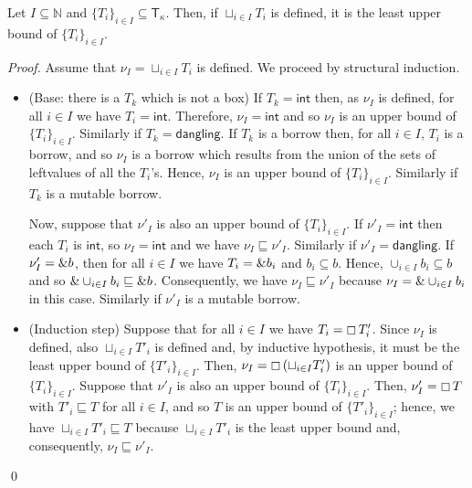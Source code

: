 \begin{lemma}\label{lemma:lub-type}
  Let $I\subseteq\mathbb{N}$ and $\{T_i\}_{i\in I}\subseteq\mathsf{T}_\kappa$.
  Then, if $\sqcup_{i\in I}T_i$ is defined, it is the least upper bound of
  $\{T_i\}_{i\in I}$.
\end{lemma}
\begin{proof}
  Assume that $\nu_I = \sqcup_{i\in I}T_i$ is defined.
  We proceed by structural induction.
  \begin{itemize}
    \item (Base: there is a $T_k$ which is not a box)
    If $T_k=\mathsf{int}$ then, as $\nu_I$ is defined, for all $i\in I$
    we have $T_i=\mathsf{int}$. Therefore, $\nu_I=\mathsf{int}$
    and so $\nu_I$ is an upper bound of $\{T_i\}_{i\in I}$.
    Similarly if $T_k=\mathsf{dangling}$.
    If $T_k$ is a borrow then, for all $i\in I$, $T_i$ is a borrow, and so
    $\nu_I$ is a borrow which results from the union of the sets of
    leftvalues of all the $T_i$'s. Hence, $\nu_I$ is an upper bound of
    $\{T_i\}_{i\in I}$.
    Similarly if $T_k$ is a mutable borrow.

    Now, suppose that $\nu'_I$ is also an upper bound of $\{T_i\}_{i\in I}$.
    If $\nu'_I=\mathsf{int}$ then each $T_i$ is $\mathsf{int}$, so
    $\nu_I=\mathsf{int}$ and we have $\nu_I\sqsubseteq\nu'_I$.
    Similarly if $\nu'_I=\mathsf{dangling}$.
    If $\nu'_I=\& b$, then for all $i\in I$ we have $T_i = \& b_i$
    and $b_i\subseteq b$. Hence, $\cup_{i\in I}b_i\subseteq b$ and so
    $\&\cup_{i\in I}b_i\sqsubseteq\& b$. Consequently, we have
    $\nu_I\sqsubseteq\nu'_I$ because $\nu_I=\&\cup_{i\in I}b_i$ in this case.
    Similarly if $\nu'_I$ is a mutable borrow.
    \item (Induction step) Suppose that for all $i\in I$ we have
    $T_i = \boxempty\,{T'_i}$. Since $\nu_I$ is defined, also
    $\sqcup_{i\in I}T'_i$ is defined and, by inductive hypothesis, it must be
    the least upper bound of $\{T'_i\}_{i\in I}$. Then,
    $\nu_I = \boxempty\,{(\sqcup_{i\in I}T'_i)}$ is an upper bound
    of $\{T_i\}_{i\in I}$. Suppose that $\nu'_I$ is also an upper bound
    of $\{T_i\}_{i\in I}$. Then, $\nu'_I=\boxempty\,{T}$ with
    $T'_i\sqsubseteq T$ for all $i\in I$, and so $T$ is an upper bound
    of $\{T'_i\}_{i\in I}$; hence, we have $\sqcup_{i\in I}T'_i\sqsubseteq T$
    because $\sqcup_{i\in I}T'_i$ is the least upper bound and,
    consequently, $\nu_I\sqsubseteq\nu'_I$.
  \end{itemize}
  \qed
\end{proof}

